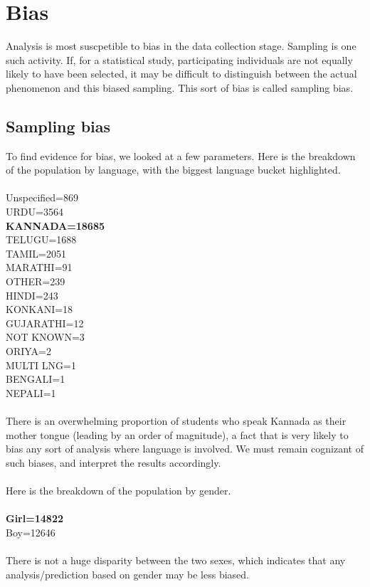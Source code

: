 \documentclass[10pt]{article}
\begin{document}
\newpage
\section{Bias}
Analysis is most suscpetible to bias in the data collection stage. Sampling is one such activity. If, for a statistical study, participating individuals are not equally likely to have been selected, it may be difficult to distinguish between the actual phenomenon and this biased sampling.
This sort of bias is called sampling bias.
\subsection{Sampling bias}
\label{sec:SamplingBias}
To find evidence for bias, we looked at a few parameters.
Here is the breakdown of the population by language, with the biggest language bucket highlighted.\\\\
Unspecified=869\\
URDU=3564\\
\textbf{KANNADA=18685}\\
TELUGU=1688\\
TAMIL=2051\\
MARATHI=91\\
OTHER=239\\
HINDI=243\\
KONKANI=18\\
GUJARATHI=12\\
NOT KNOWN=3\\
ORIYA=2\\
MULTI LNG=1\\
BENGALI=1\\
NEPALI=1\\
\\
There is an overwhelming proportion of students who speak Kannada as their mother tongue (leading by an order of magnitude), a fact that is very likely to bias any sort of analysis where language is involved. We must remain cognizant of such biases, and interpret the results accordingly.\\\\
Here is the breakdown of the population by gender.\\\\
\textbf{Girl=14822}\\
Boy=12646\\\\
There is not a huge disparity between the two sexes, which indicates that any analysis/prediction based on gender may be less biased.
\end{document}
